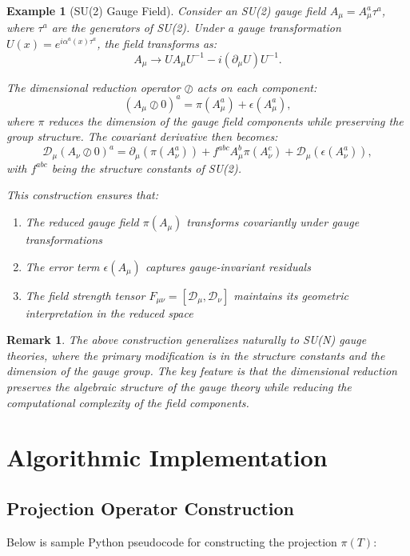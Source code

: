 \documentclass[sn-mathphys-num]{sn-jnl}
\theoremstyle{thmstyleone}
\theoremstyle{thmstyletwo}
\newtheorem{example}{Example}
\newtheorem{remark}{Remark}
\theoremstyle{thmstylethree}
\begin{document}
\begin{example}[SU(2) Gauge Field]
Consider an SU(2) gauge field $A_\mu = A_\mu^a \tau^a$, where $\tau^a$ are the generators of SU(2). Under a gauge transformation $U(x) = e^{i\alpha^a(x)\tau^a}$, the field transforms as:
\[
A_\mu \rightarrow U A_\mu U^{-1} - i(\partial_\mu U)U^{-1}.
\]

The dimensional reduction operator $\oslash$ acts on each component:
\[
(A_\mu \oslash 0)^a = \pi(A_\mu^a) + \epsilon(A_\mu^a),
\]
where $\pi$ reduces the dimension of the gauge field components while preserving the group structure. The covariant derivative then becomes:
\[
\mathcal{D}_\mu(A_\nu \oslash 0)^a = \partial_\mu(\pi(A_\nu^a)) + f^{abc}A_\mu^b\pi(A_\nu^c) + \mathcal{D}_\mu(\epsilon(A_\nu^a)),
\]
with $f^{abc}$ being the structure constants of SU(2).

This construction ensures that:
\begin{enumerate}
    \item The reduced gauge field $\pi(A_\mu)$ transforms covariantly under gauge transformations
    \item The error term $\epsilon(A_\mu)$ captures gauge-invariant residuals
    \item The field strength tensor $F_{\mu\nu} = [\mathcal{D}_\mu, \mathcal{D}_\nu]$ maintains its geometric interpretation in the reduced space
\end{enumerate}
\end{example}

\begin{remark}
The above construction generalizes naturally to SU(N) gauge theories, where the primary modification is in the structure constants and the dimension of the gauge group. The key feature is that the dimensional reduction preserves the algebraic structure of the gauge theory while reducing the computational complexity of the field components.
\end{remark}

\section{Algorithmic Implementation}

\subsection{Projection Operator Construction}

Below is sample Python pseudocode for constructing the projection $\pi(T)$:
\end{document}
